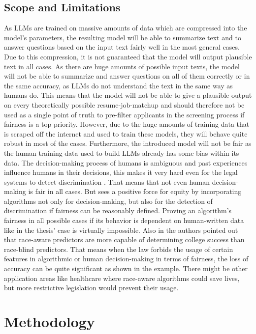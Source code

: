 \documentclass[draft,final]{thesisclass} %
\begin{document}
\section{Scope and Limitations}
As \acs{LLM}s are trained on massive amounts of data which are compressed into the model's parameters, the resulting model will be able to summarize text and to answer questions based on the input text fairly well in the most general cases.
Due to this compression, it is not guaranteed that the model will output plausible text in all cases. 
As there are huge amounts of possible input texts, the model will not be able to summarize and answer questions on all of them correctly or in the same accuracy, as \acs{LLM}s do not understand the text in the same way as humans do.
This means that the model will not be able to give a plausible output on every theoretically possible resume-job-matchup and should therefore not be used as a single point of truth to pre-filter applicants in the screening process if fairness is a top priority.
However, due to the huge amounts of training data that is scraped off the internet and used to train these models, they will behave quite robust in most of the cases.
Furthermore, the introduced model will not be fair as the human training data used to build \acs{LLM}s already has some bias within its data. The decision-making process of humans is ambiguous and past experiences influence humans in their decisions, this makes it very hard even for the legal systems to detect discrimination \cite[113]{discrimination_algorithms}. That means that not even human decision-making is fair in all cases. But \cite[113]{discrimination_algorithms} sees a positive force for equity by incorporating algorithms not only for decision-making, but also for the detection of discrimination if fairness can be reasonably defined. Proving an algorithm's fairness in all possible cases if its behavior is dependent on human-written data like in the thesis' case is virtually impossible. Also in \cite[158-160]{discrimination_algorithms} the authors pointed out that race-aware predictors are more capable of determining college success than race-blind predictors.
That means when the law forbids the usage of certain features in algorithmic or human decision-making in terms of fairness, the loss of accuracy can be quite significant as shown in the example. There might be other application areas like healthcare where race-aware algorithms could save lives, but more restrictive legislation would prevent their usage.

\chapter{Methodology}
\end{document}
